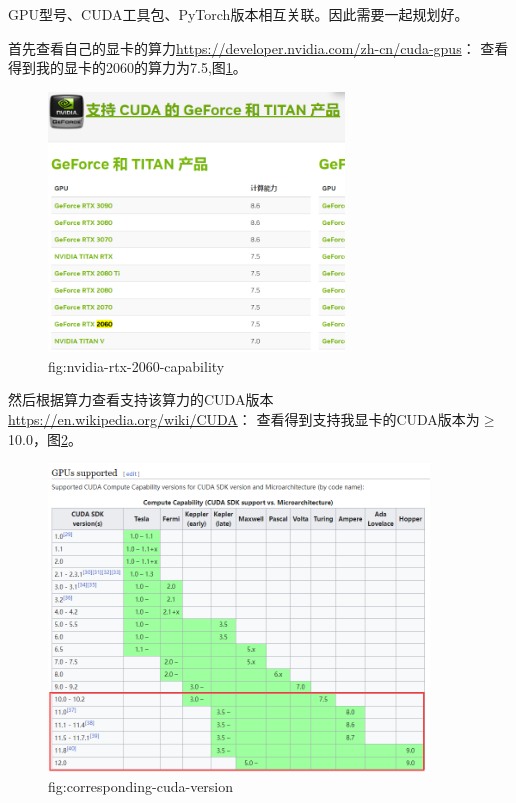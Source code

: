 GPU型号、CUDA工具包、PyTorch版本相互关联。因此需要一起规划好。

首先查看自己的显卡的算力\url{https://developer.nvidia.com/zh-cn/cuda-gpus}：
查看得到我的显卡的2060的算力为7.5,图\ref{fig:nvidia-rtx-2060-capability}。

\begin{figure}[htbp]
    \centering
    \includegraphics[width=0.7\textwidth]{figures/nvidia-rtx-2060-capability.png}
    \caption{fig:nvidia-rtx-2060-capability}
    \label{fig:nvidia-rtx-2060-capability}
\end{figure}

然后根据算力查看支持该算力的CUDA版本\url{https://en.wikipedia.org/wiki/CUDA}：
查看得到支持我显卡的CUDA版本为$\geq$10.0，图\ref{fig:corresponding-cuda-version}。
\begin{figure}[htbp]
    \centering
    \includegraphics[width=0.9\textwidth]{figures/corresponding-cuda-version.png}
    \caption{fig:corresponding-cuda-version}
    \label{fig:corresponding-cuda-version}
\end{figure}

